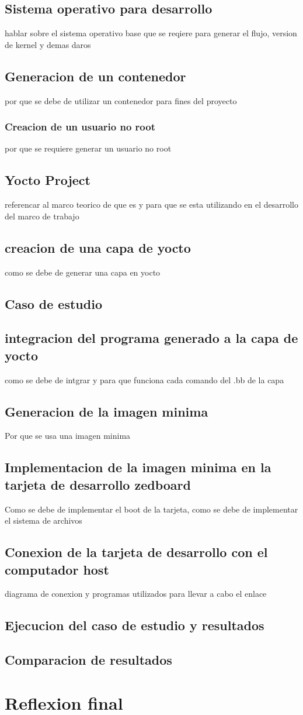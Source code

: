 \subsection{Sistema operativo para desarrollo}
hablar sobre el sistema operativo base que se reqiere para generar el flujo, version de kernel y demas daros 

\subsection{Generacion de un contenedor}
por que se debe de utilizar un contenedor para fines del proyecto
\subsubsection{Creacion de un usuario no root}
por que se requiere generar un usuario no root 
\subsection{Yocto Project}
referencar al marco teorico de que es y para que se esta utilizando en el desarrollo del marco de trabajo
\subsection{creacion de una capa de yocto}
como se debe de generar una capa en yocto
\subsection{Caso de estudio}
\subsection{integracion del programa generado a la capa de yocto}
como se debe de intgrar y para que funciona cada comando del .bb de la capa
\subsection{Generacion de la imagen minima}
Por que se usa una imagen minima 
\subsection{Implementacion de la imagen minima en la tarjeta de desarrollo zedboard}
Como se debe de implementar el boot de la tarjeta, como se debe de implementar el  sistema de archivos
\subsection{Conexion de la tarjeta de desarrollo con el computador host}
diagrama de conexion y programas utilizados para llevar a cabo el enlace

\subsection{Ejecucion del caso de estudio y resultados}

\subsection{Comparacion de resultados}

\section{Reflexion final}